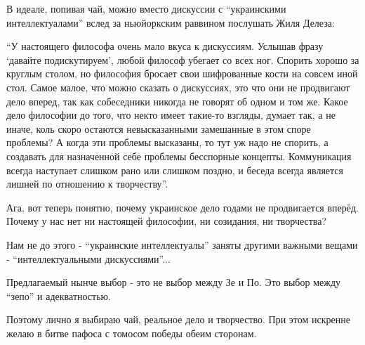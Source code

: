 В идеале, попивая чай, можно вместо дискуссии с \enquote{украинскими
интеллектуалами} вслед за ньюйоркским раввином послушать Жиля Делеза: 

\enquote{У настоящего философа очень мало вкуса к дискуссиям.  Услышав фразу
\enquote{давайте подискутируем}, любой философ убегает со всех ног. Спорить
хорошо за круглым столом, но философия бросает свои шифрованные кости на совсем
иной стол. Самое малое, что можно сказать о дискуссиях, это что они не
продвигают дело вперед, так как собеседники никогда не говорят об одном и том
же. Какое дело философии до того, что некто имеет такие-то взгляды, думает так,
а не иначе, коль скоро остаются невысказанными замешанные в этом споре
проблемы? А когда эти проблемы высказаны, то тут уж надо не спорить, а
создавать для назначенной себе проблемы бесспорные концепты. Коммуникация
всегда наступает слишком рано или слишком поздно, и беседа всегда является
лишней по отношению к творчеству}.

Ага, вот теперь понятно, почему украинское дело годами не продвигается вперёд.
Почему у нас нет ни настоящей философии, ни созидания, ни творчества?

Нам не до этого - \enquote{украинские интеллектуалы} заняты другими важными
вещами - \enquote{интеллектуальными дискуссиями}...

Предлагаемый нынче выбор -  это не выбор между Зе и По. Это выбор между
\enquote{зепо} и адекватностью. 

Поэтому лично я выбираю чай, реальное дело и творчество. При этом искренне
желаю в битве пафоса с томосом победы обеим сторонам.


